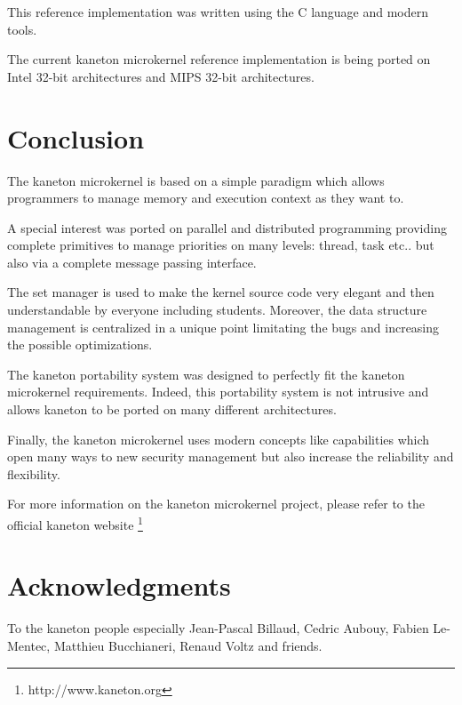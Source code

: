 \begin{multicols}{2}
This reference implementation was written using the C language and
modern tools.

The current kaneton microkernel reference implementation is being
ported on Intel 32-bit architectures and MIPS 32-bit architectures.

%
%

\section{Conclusion}

The kaneton microkernel is based on a simple paradigm which allows
programmers to manage memory and execution context as they want to.

A special interest was ported on parallel and distributed programming
providing complete primitives to manage priorities on many levels:
thread, task etc.. but also via a complete message passing interface.

The set manager is used to make the kernel source code very elegant
and then understandable by everyone including students. Moreover, the
data structure management is centralized in a unique point limitating
the bugs and increasing the possible optimizations.

The kaneton portability system was designed to perfectly fit the
kaneton microkernel requirements. Indeed, this portability system
is not intrusive and allows kaneton to be ported on many different
architectures.

Finally, the kaneton microkernel uses modern concepts like
capabilities which open many ways to new security management but
also increase the reliability and flexibility.

For more information on the kaneton microkernel project, please refer
to the official kaneton website
  \footnote{http://www.kaneton.org}

%
%

\section{Acknowledgments}

To the kaneton people especially Jean-Pascal Billaud, Cedric Aubouy,
Fabien Le-Mentec, Matthieu Bucchianeri, Renaud Voltz and friends.

\end{multicols}


